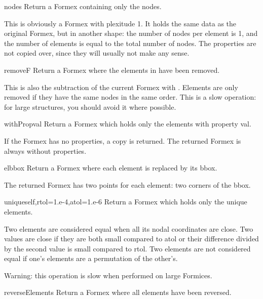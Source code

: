 {{\begin{methoddesc}{nodes}{}
Return a Formex containing only the nodes.

This is obviously a Formex with plexitude 1. It holds the same data as the original Formex, but in another shape: the number of nodes per element is 1, and the number of elements is equal to the total number of nodes. The properties are not copied over, since they will usually not make any sense.
\end{methoddesc}

\begin{methoddesc}{remove}{F}
Return a Formex where the elements in  have been removed.

This is also the subtraction of the current Formex with . Elements are only removed if they have the same nodes in the same order. This is a slow operation: for large structures, you should avoid it where possible.
\end{methoddesc}

\begin{methoddesc}{withProp}{val}
Return a Formex which holds only the elements with property val.

If the Formex has no properties, a copy is returned.
The returned Formex is always without properties.
\end{methoddesc}

\begin{methoddesc}{elbbox}{}
Return a Formex where each element is replaced by its bbox.

The returned Formex has two points for each element: two corners
of the bbox.
\end{methoddesc}

\begin{methoddesc}{unique}{self,rtol=1.e-4,atol=1.e-6}
Return a Formex which holds only the unique elements.

Two elements are considered equal when all its nodal coordinates
are close. Two values are close if they are both small compared to atol
or their difference divided by the second value is small compared to
rtol.
Two elements are not considered equal if one's elements are a
permutation of the other's.

Warning: this operation is slow when performed on large Formices.
\end{methoddesc}

\begin{methoddesc}{reverseElements}{}
Return a Formex where all elements have been reversed.


\end{methoddesc}}}
